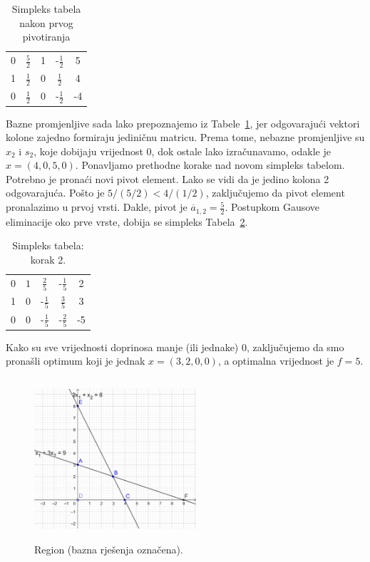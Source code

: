 \documentclass[a4paper, utf8, 11pt, colorlinks]{book}
\theoremstyle{definition}
\begin{document}
  \begin{table}[H]
     \centering
     \begin{tabular}{c c c c | c}
         0 &  $\frac{5}{2}$  & 1 & -$\frac{1}{2} $& 5 \\
         1 &  $\frac{1}{2}$ & 0 & $\frac{1}{2}$ & 4 \\ \hline
         0 &  $\frac{1}{2}$ & 0 & -$\frac{1}{2}$ & -4 \\ \hline
     \end{tabular}
     \caption{Simpleks tabela nakon prvog pivotiranja}
     \label{tab:simpleks_tabela2}
 \end{table}
Bazne promjenljive sada lako prepoznajemo iz Tabele~\ref{tab:simpleks_tabela2}, jer odgovarajući vektori kolone zajedno formiraju jediničnu matricu. Prema tome, 
 nebazne promjenljive su $x_2$ i $s_2$, koje dobijaju vrijednost 0, dok ostale lako izračunavamo, odakle je $ x = (4, 0, 5, 0)$. Ponavljamo prethodne korake nad novom simpleks tabelom. Potrebno je pronaći novi pivot element. Lako se vidi da je jedino kolona 2 odgovarajuća. Pošto je $5 / (5/2) < 4 / (1/2)$, zaključujemo da  pivot element pronalazimo u prvoj vrsti. Dakle, pivot je 
 $\overline{a}_{1,2} = \frac{5}{2}$. Postupkom Gausove eliminacije oko prve vrste, dobija se simpleks Tabela~\ref{tab:simpleks_tabela3}.
 
   \begin{table}[!ht]
     \centering
     \begin{tabular}{c c c c | c}
         0 &  $1$  & $\frac{2}{5}$             &  -$\frac{1}{5} $ & 2 \\
         1 &  0    &      -$\frac{1}{5}$    & $\frac{3}{5}$    & 3 \\ \hline
         0 &  0    &   -$\frac{1}{5}$       &   -$\frac{2}{5}$   & -5 \\ \hline
     \end{tabular}
     \caption{Simpleks tabela: korak 2.}
     \label{tab:simpleks_tabela3}
 \end{table}
 Kako su sve vrijednosti doprinosa manje (ili jednake) 0, zaključujemo da smo pronašli optimum koji je jednak $x = (3, 2, 0, 0)$, a optimalna vrijednost je $f = 5$.
 
 \begin{figure}[!ht]
     \centering
     \includegraphics[width=170pt, height=170pt]{simpleks-region-2.eps}
     \caption{Region (bazna rješenja označena).}
     \label{fig:simplex_region} 
 \end{figure}
 
\end{document}
